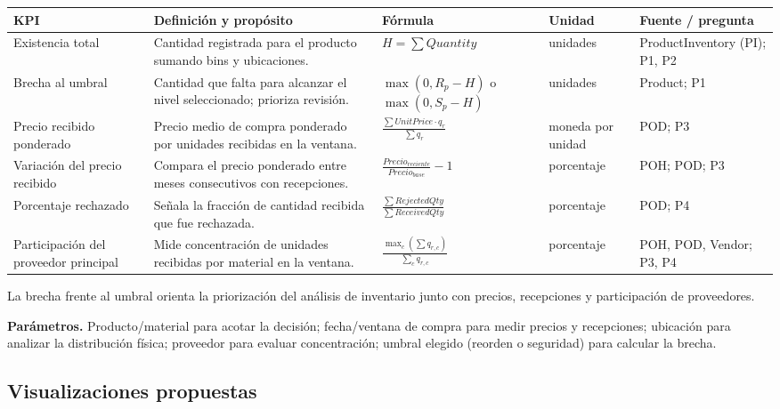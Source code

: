 \documentclass[10pt,a4paper]{article}
\begin{document}
\small
\begin{longtable}{p{}p{}p{}p{}p{}}
\toprule
\textbf{KPI} & \textbf{Definición y propósito} & \textbf{Fórmula} &
\textbf{Unidad} & \textbf{Fuente / pregunta}\\
\midrule
\endhead
Existencia total & Cantidad registrada para el producto sumando bins y
ubicaciones. & \(H=\sum Quantity\) & unidades & ProductInventory (PI);
P1, P2\\
Brecha al umbral & Cantidad que falta para alcanzar el nivel seleccionado;
prioriza revisión. & \(\max(0,R_p-H)\) o \(\max(0,S_p-H)\) & unidades &
Product; P1\\
Precio recibido ponderado & Precio medio de compra ponderado por unidades
recibidas en la ventana. & \(\frac{\sum UnitPrice\cdot q_r}{\sum q_r}\) &
moneda por unidad & POD; P3\\
Variación del precio recibido & Compara el precio ponderado entre meses
consecutivos con recepciones. & \(\frac{Precio_{reciente}}{Precio_{base}}-1\) &
porcentaje & POH; POD; P3\\
Porcentaje rechazado & Señala la fracción de cantidad recibida que fue
rechazada. & \(\frac{\sum RejectedQty}{\sum ReceivedQty}\) & porcentaje &
POD; P4\\
Participación del proveedor principal & Mide concentración de unidades
recibidas por material en la ventana. & \(\frac{\max_c(\sum q_{r,c})}
{\sum_c q_{r,c}}\) & porcentaje & POH, POD, Vendor; P3, P4\\
\bottomrule
\end{longtable}
\normalsize

La brecha frente al umbral orienta la priorización del análisis de inventario
junto con precios, recepciones y participación de proveedores.

\textbf{Parámetros.} Producto/material para acotar la decisión; fecha/ventana
de compra para medir precios y recepciones; ubicación para analizar la
distribución física; proveedor para evaluar concentración; umbral elegido
(reorden o seguridad) para calcular la brecha.

\subsection*{Visualizaciones propuestas}
\end{document}
